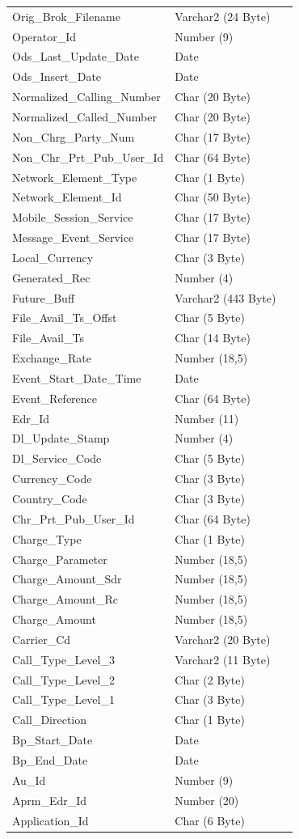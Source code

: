 \documentclass[12pt,twoside]{article}
\begin{document}
\begin{longtable}{l|l|l}
Orig\_Brok\_Filename & Varchar2 (24 Byte) & \\
Operator\_Id & Number (9) & \\
Ods\_Last\_Update\_Date & Date & \\
Ods\_Insert\_Date & Date & \\
Normalized\_Calling\_Number & Char (20 Byte) & \\
Normalized\_Called\_Number & Char (20 Byte) & \\
Non\_Chrg\_Party\_Num & Char (17 Byte) & \\
Non\_Chr\_Prt\_Pub\_User\_Id & Char (64 Byte) & \\
Network\_Element\_Type & Char (1 Byte) & \\
Network\_Element\_Id & Char (50 Byte) & \\
Mobile\_Session\_Service & Char (17 Byte) & \\
Message\_Event\_Service & Char (17 Byte) & \\
Local\_Currency & Char (3 Byte) & \\
Generated\_Rec & Number (4) & \\
Future\_Buff & Varchar2 (443 Byte) & \\
File\_Avail\_Ts\_Offst & Char (5 Byte) & \\
File\_Avail\_Ts & Char (14 Byte) & \\
Exchange\_Rate & Number (18,5) & \\
Event\_Start\_Date\_Time & Date & \\
Event\_Reference & Char (64 Byte) & \\
Edr\_Id & Number (11) & \\
Dl\_Update\_Stamp & Number (4) & \\
Dl\_Service\_Code & Char (5 Byte) & \\
Currency\_Code & Char (3 Byte) & \\
Country\_Code & Char (3 Byte) & \\
Chr\_Prt\_Pub\_User\_Id & Char (64 Byte) & \\
Charge\_Type & Char (1 Byte) & \\
Charge\_Parameter & Number (18,5) & \\
Charge\_Amount\_Sdr & Number (18,5) & \\
Charge\_Amount\_Rc & Number (18,5) & \\
Charge\_Amount & Number (18,5) & \\
Carrier\_Cd & Varchar2 (20 Byte) & \\
Call\_Type\_Level\_3 & Varchar2 (11 Byte) & \\
Call\_Type\_Level\_2 & Char (2 Byte) & \\
Call\_Type\_Level\_1 & Char (3 Byte) & \\
Call\_Direction & Char (1 Byte) & \\
Bp\_Start\_Date & Date & \\
Bp\_End\_Date & Date & \\
Au\_Id & Number (9) & \\
Aprm\_Edr\_Id & Number (20) & \\
Application\_Id & Char (6 Byte) & \\
\hline
\end{longtable}
\normalsize
\end{document}

